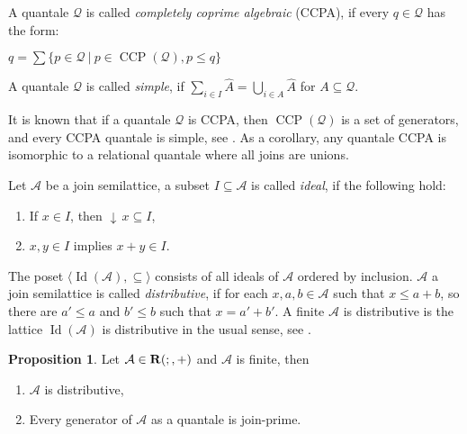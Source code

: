 \documentclass[a4paper]{article}
\theoremstyle{definition}
\theoremstyle{theorem}
\theoremstyle{proposition}
\newtheorem{proposition}{Proposition}
\theoremstyle{lemma}
\theoremstyle{ex}
\theoremstyle{corollary}
\theoremstyle{claim}
\newcommand{\down}[1]{\ensuremath{{\downarrow}\,#1}}
\begin{document}
A quantale $\mathcal{Q}$ is called \emph{completely coprime algebraic} (CCPA), if every $q \in \mathcal{Q}$ has the form:
\begin{center}
  $q = \sum \limits \{ p \in \mathcal{Q} \: | \: p \in \operatorname{CCP}(\mathcal{Q}), p \leq q \}$
\end{center}

A quantale $\mathcal{Q}$ is called \emph{simple}, if
$\sum \limits_{i \in I} \widehat{A} = \bigcup \limits_{i \in A} \widehat{A}$ for $A \subseteq \mathcal{Q}$.

It is known that if a quantale $\mathcal{Q}$ is CCPA, then $\operatorname{CCP}(\mathcal{Q})$ is a set of generators, and every CCPA quantale is simple, see \cite[Lemma 5.3, Lemma 5.5, and Proposition 5.6]{brown1993representation}. As a corollary, any quantale CCPA is isomorphic to a relational quantale where all joins are unions.

Let $\mathcal{A}$ be a join semilattice, a subset $I \subseteq \mathcal{A}$ is called \emph{ideal}, if the following hold:
\begin{enumerate}
  \item If $x \in I$, then $\down{x} \subseteq I$,
  \item $x, y \in I$ implies $x + y \in I$.
\end{enumerate}
The poset $\langle \operatorname{Id}(\mathcal{A}), \subseteq \rangle$ consists of all ideals of $\mathcal{A}$ ordered by inclusion. $\mathcal{A}$ a join semilattice is called \emph{distributive}, if for each $x, a, b \in \mathcal{A}$ such that $x \leq a + b$, so there are $a' \leq a$ and $b' \leq b$ such that $x = a' + b'$. A finite $\mathcal{A}$ is distributive is the lattice $\operatorname{Id}(\mathcal{A})$ is distributive in the usual sense, see \cite[Lemma 184]{gratzer2011lattice}.

\begin{proposition} \label{distr}
  Let $\mathcal{A} \in {\bf R}(;,+)$ and $\mathcal{A}$ is finite, then
  \begin{enumerate}
    \item $\mathcal{A}$ is distributive,
    \item Every generator of $\mathcal{A}$ as a quantale is join-prime.
  \end{enumerate}
\end{proposition}
\end{document}
